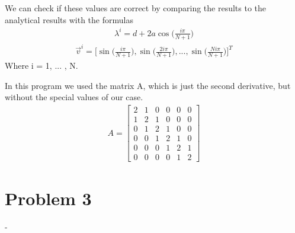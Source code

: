 \documentclass[english,notitlepage]{revtex4-1}  %
\begin{document}
We can check if these values are correct by comparing the results to the analytical results with the formulas
\begin{align*}
\lambda^{i} = d + 2a \cos \bigg(\frac{i \pi}{N + 1} \bigg) 
\end{align*}
\begin{align*}
\vec{v}^{i} = \bigg[ \sin \bigg(\frac{i \pi}{N + 1} \bigg), \sin \bigg( \frac{2i \pi}{N + 1} \bigg), ... , \sin \bigg(\frac{Ni \pi}{N + 1} \bigg) \bigg]^T 
\end{align*}
Where i = 1, ... , N. 





In this program we used the matrix A, which is just the second derivative, but without the special values of our case. 
\begin{align*}
     A = \begin{bmatrix}
    2 & 1 & 0 & 0 & 0 & 0 \\
    1 & 2 & 1 & 0 & 0 & 0 \\
    0 & 1 & 2 & 1 & 0 & 0 \\
    0 & 0 & 1 & 2 & 1 & 0 \\
    0 & 0 & 0 & 1 & 2 & 1 \\
    0 & 0 & 0 & 0 & 1 & 2
    \end{bmatrix}
\end{align*}


 



\section*{Problem 3}
-
   
\end{document}
